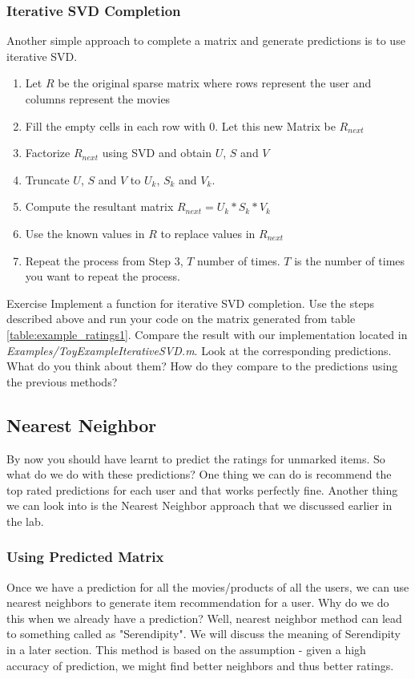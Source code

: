   \subsubsection{Iterative SVD Completion}
  Another simple approach to complete a matrix and generate predictions is to use iterative SVD. 
  \begin{enumerate}
    \item Let $R$ be the original sparse matrix where rows represent the user and columns represent the movies
    \item Fill the empty cells in each row with 0. Let this new Matrix be $R_{next}$
    \item Factorize $R_{next}$ using SVD and obtain $U$, $S$ and $V$
    \item Truncate $U$, $S$ and $V$ to $U_k$, $S_k$ and $V_k$.
    \item Compute the resultant matrix $R_{next} = U_k*S_k*V_k$
    \item Use the known values in $R$ to replace values in $R_{next}$
    \item Repeat the process from Step 3, $T$ number of times. $T$ is the number of times you want to repeat the process.
  \end{enumerate}
\begin{myremark}{Exercise }
Implement a function for iterative SVD completion. Use the steps described above and run your code on the matrix generated from table \ref{table:example_ratings1}. Compare the result with our implementation located in \textit{Examples/ToyExampleIterativeSVD.m}. Look at the corresponding predictions. What do you think about them? How do they compare to the predictions using the previous methods?
\end{myremark}
  \subsection{Nearest Neighbor}
  By now you should have learnt to predict the ratings for unmarked items. So what do we do with these predictions? One thing we can do is recommend the top rated predictions for each user and that works perfectly fine. Another thing we can look into is the Nearest Neighbor approach that we discussed earlier in the lab.
  \subsubsection{Using Predicted Matrix}
  Once we have a prediction for all the movies/products of all the users, we can use nearest neighbors to generate item recommendation for a user. Why do we do this when we already have a prediction? Well, nearest neighbor method can lead to something called as "Serendipity". We will discuss the meaning of Serendipity in a later section. This method is based on the assumption - given a high accuracy of prediction, we might find better neighbors and thus better ratings.
